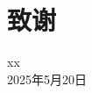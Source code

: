 \chapter{致\HDUspace{}谢}



\vspace{1cm}
\hfill
\begin{minipage}{14em}
    \begin{flushright}
        xx\\
        2025年5月20日
    \end{flushright}
\end{minipage}
